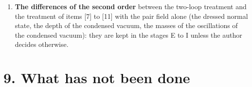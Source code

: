 \documentclass[
  10pt,
]{article}
\begin{document}
\begin{enumerate}
  the normal correlations of the vacuum, so that \(m_{\rm LL}\) and
  \(\mu_{\rm LL}\) of Test 2 are the Dirac mass and the chemical
  potential of the vacuum (adopted); or the axially symmetric completion
  of the interaction with the pseudoscalar pair operators
  \(\Pi'^\iota_{\rm LL}\), in which no state dresses the mass
  (recorded).
\item
  \textbf{The differences of the second order} between the two-loop
  treatment and the treatment of items {[}7{]} to {[}11{]} with the pair
  field alone (the dressed normal state, the depth of the condensed
  vacuum, the masses of the oscillations of the condensed vacuum): they
  are kept in the stages E to I unless the author decides otherwise.
\end{enumerate}

\hypertarget{what-has-not-been-done}{%
\section{9. What has not been done}\label{what-has-not-been-done}}
\end{document}
